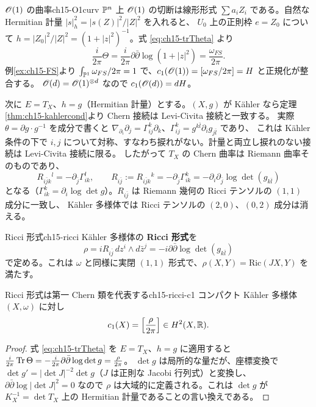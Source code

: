 \begin{myex}{$\mathscr{O}(1)$ の曲率}{ch15-O1curv}
$\mathbb{P}^n$ 上 $\mathscr{O}(1)$ の切断は線形形式 $\sum a_iZ_i$ である。自然な Hermitian 計量 $|s|^2_h = |s(Z)|^2/|Z|^2$ を入れると、
$U_0$ 上の正則枠 $e = Z_0$ について $h = |Z_0|^2/|Z|^2 = (1+|z|^2)^{-1}$。式 \eqref{eq:ch15-trTheta} より
\[
\frac{i}{2\pi}\Theta = \frac{i}{2\pi}\partial\bar\partial\log(1+|z|^2) = \frac{\omega_{FS}}{2\pi} .
\]
例\ref{ex:ch15-FS}より $\int_{\mathbb{P}^1}\omega_{FS}/2\pi = 1$ で、$c_1(\mathscr{O}(1)) = [\omega_{FS}/2\pi] = H$ と正規化が整合する。
$\mathscr{O}(d) = \mathscr{O}(1)^{\otimes d}$ なので $c_1(\mathscr{O}(d)) = dH$。
\end{myex}

次に $E = T_X$、$h = g$（Hermitian 計量）とする。$(X,g)$ が K\"ahler なら定理\ref{thm:ch15-kahlercond}より Chern 接続は Levi-Civita 接続と一致する。
実際 $\theta = \partial g\cdot g^{-1}$ を成分で書くと $\nabla_{\partial_i}\partial_j = \Gamma^k_{ij}\partial_k$、$\Gamma^k_{ij} = g^{k\bar l}\partial_i g_{j\bar l}$ であり、
これは K\"ahler 条件の下で $i,j$ について対称、すなわち捩れがない。計量と両立し捩れのない接続は Levi-Civita 接続に限る。
したがって $T_X$ の Chern 曲率は Riemann 曲率そのものであり、
\[
R_{i\bar j k}{}^{l} = -\partial_{\bar j}\Gamma^l_{ik},\qquad
R_{i\bar j} := R_{i\bar j k}{}^{k} = -\partial_{\bar j}\Gamma^k_{ik} = -\partial_i\partial_{\bar j}\log\det(g_{k\bar l})
\]
となる（$\Gamma^k_{ik} = \partial_i\log\det g$）。$R_{i\bar j}$ は Riemann 幾何の Ricci テンソルの $(1,1)$ 成分に一致し、
K\"ahler 多様体では Ricci テンソルの $(2,0)$、$(0,2)$ 成分は消える。

\begin{mydef}{Ricci 形式}{ch15-ricci}
K\"ahler 多様体の \textbf{Ricci 形式}を
\[
\rho = i R_{i\bar j}\,dz^i\wedge d\bar z^j = -i\partial\bar\partial\log\det(g_{k\bar l})
\]
で定める。これは $\omega$ と同様に実閉 $(1,1)$ 形式で、$\rho(X,Y) = \mathrm{Ric}(JX,Y)$ を満たす。
\end{mydef}

\begin{mythm}{Ricci 形式は第一 Chern 類を代表する}{ch15-ricci-c1}
コンパクト K\"ahler 多様体 $(X,\omega)$ に対し
\[
c_1(X) = \Big[\frac{\rho}{2\pi}\Big]\in H^2(X,\mathbb{R}).
\]
\end{mythm}

\begin{proof}
式 \eqref{eq:ch15-trTheta} を $E = T_X$、$h = g$ に適用すると
$\frac{i}{2\pi}\operatorname{Tr}\Theta = -\frac{i}{2\pi}\partial\bar\partial\log\det g = \frac{\rho}{2\pi}$。
$\det g$ は局所的な量だが、座標変換で $\det g' = |\det J|^{-2}\det g$（$J$ は正則な Jacobi 行列式）と変換し、
$\partial\bar\partial\log|\det J|^2 = 0$ なので $\rho$ は大域的に定義される。これは $\det g$ が $K_X^{-1} = \det T_X$ 上の Hermitian 計量であることの言い換えである。
\end{proof}

